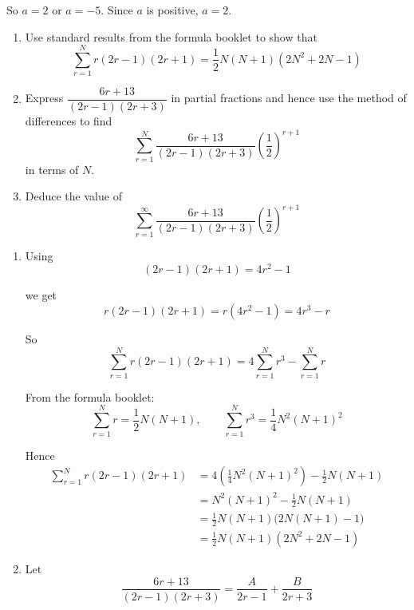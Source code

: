 \documentclass[leqno]{article}
\begin{document}
\begin{enumerate}[
  label=\textbf{\arabic*.},
  leftmargin=*,
  topsep=0pt,
  partopsep=0pt,
  parsep=0pt
]
\begin{djsSolution}
\begin{enumerate}[label=\textbf{(\alph*)}]
So \(a=2\) or \(a=-5\). Since \(a\) is positive, \(a=2\).

\end{enumerate}
\end{djsSolution}


\newpage

\questionitem

\begin{enumerate}[label=\textbf{(\alph*)}]
  \item Use standard results from the formula booklet to show that
  \[
  \sum_{r=1}^{N} r(2r-1)(2r+1)=\frac{1}{2}N(N+1)(2N^2+2N-1)
  \]
  \item Express $\dfrac{6r+13}{(2r-1)(2r+3)}$ in partial fractions and hence use the method of differences to find
  \[
  \sum_{r=1}^{N} \frac{6r+13}{(2r-1)(2r+3)}\left(\frac{1}{2}\right)^{r+1}
  \]
  in terms of $N$.  \\
  \item Deduce the value of
  \[
  \sum_{r=1}^{\infty} \frac{6r+13}{(2r-1)(2r+3)}\left(\frac{1}{2}\right)^{r+1}
  \]
\end{enumerate}

\vspace*{10pt}

\begin{djsSolution}
\begin{enumerate}[label=\textbf{(\alph*)}]
  \item Using
\[
(2r-1)(2r+1)=4r^2-1
\]

we get
\[
r(2r-1)(2r+1)=r(4r^2-1)=4r^3-r
\]

So
\[
\sum_{r=1}^{N} r(2r-1)(2r+1)=4\sum_{r=1}^{N} r^3-\sum_{r=1}^{N} r
\]

From the formula booklet:
\[
\sum_{r=1}^{N} r=\frac12 N(N+1),
\qquad
\sum_{r=1}^{N} r^3=\frac14 N^2(N+1)^2
\]

Hence
\begin{align*}
\sum_{r=1}^{N} r(2r-1)(2r+1)
&=4\left(\frac14 N^2(N+1)^2\right)-\frac12 N(N+1) \\
&=N^2(N+1)^2-\frac12 N(N+1) \\
&=\frac12 N(N+1)\bigl(2N(N+1)-1\bigr) \\
&=\frac12 N(N+1)(2N^2+2N-1)
\end{align*}

  \item Let
\[
\frac{6r+13}{(2r-1)(2r+3)}=\frac{A}{2r-1}+\frac{B}{2r+3}
\]


\end{enumerate}
\end{djsSolution}
\end{enumerate}
\end{document}
